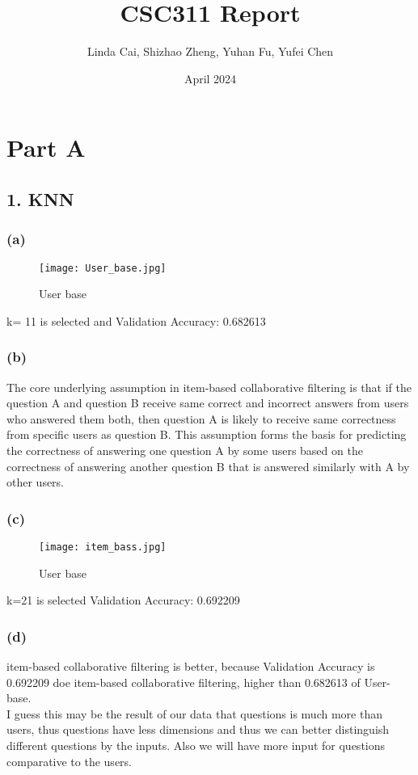 \documentclass[12pt]{article}
\title{CSC311 Report}
\author{Linda Cai, Shizhao Zheng, Yuhan Fu, Yufei Chen}
\date{April 2024}
\begin{document}
\maketitle
\section*{Part A}
\subsection*{1. KNN}
\subsubsection*{(a)}
\begin{figure}[h]
  \centering
  \texttt{[image: User\_base.jpg]}
  \caption{User base}

\end{figure}
 k= 11 is selected and
Validation Accuracy: 0.682613
\subsubsection*{(b)}

The core underlying assumption in item-based collaborative filtering is that if the question A and question B receive same correct and incorrect answers from users who answered them both, then question A is likely to receive same correctness from specific users as question B. This assumption forms the basis for predicting the correctness of answering one question A by some users based on the correctness of answering another question B that is answered similarly with A by other users.

\subsubsection*{(c)}

\begin{figure}[h]
  \centering
  \texttt{[image: item\_bass.jpg]}
  \caption{User base}

\end{figure}

k=21 is selected
Validation Accuracy: 0.692209

\subsubsection*{(d)}

item-based collaborative filtering is better, because Validation Accuracy is 0.692209 doe item-based collaborative filtering, higher than 0.682613 of User-base.\\
I guess this may be the result of our data that questions is much more than users, thus questions have less dimensions and thus we can better distinguish different questions by the inputs. Also we will have more input for questions comparative to the users.
\end{document}
